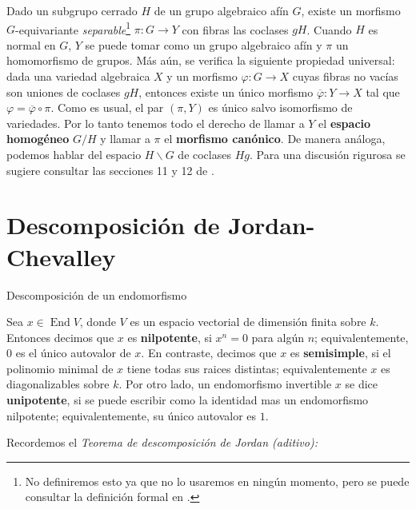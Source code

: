 \documentclass[spanish,10pt]{amsart}
\makeatletter
\renewcommand\subsection{\@startsection{subsection}{2}%
  \z@{.5\linespacing\@plus.7\linespacing}{-.5em}%
  {\normalfont\sffamily}}
\theoremstyle{definition}
\theoremstyle{remark}
\numberwithin{equation}{section}
\renewcommand{\bar}[1]{\overline{#1}}
\makeatother
\begin{document}
Dado un subgrupo cerrado $H$ de un grupo algebraico afín $G$, existe un morfismo $G$-equivariante \textit{separable}\footnote{No definiremos esto ya que no lo usaremos en ningún momento, pero se puede consultar la definición formal en \cite{humphreys2012linearAlgebraicGroups}.} $\pi : G \to Y$ con fibras las coclases $g H$. Cuando $H$ es normal en $G$, $Y$ se puede tomar como un grupo algebraico afín y $\pi$ un homomorfismo de grupos. Más aún, se verifica la siguiente propiedad universal: dada una variedad algebraica $X$ y un morfismo $\varphi : G \to X$ cuyas fibras no vacías son uniones de coclases $gH$, entonces existe un único morfismo $\bar \varphi : Y \to X$ tal que $\varphi = \bar \varphi \circ \pi$. Como es usual, el par $(\pi, Y)$ es único salvo isomorfismo de variedades. Por lo tanto tenemos todo el derecho de llamar a $Y$ el \textbf{espacio homogéneo} $G/H$ y llamar a $\pi$ el \textbf{morfismo canónico}. De manera análoga, podemos hablar del espacio $H\backslash G$ de coclases $Hg$. Para una discusión rigurosa se sugiere consultar las secciones 11 y 12 de \cite{humphreys2012linearAlgebraicGroups}.





\section{Descomposición de Jordan-Chevalley}

\subsection{Descomposición de un endomorfismo}

Sea $x \in \operatorname{End} V$, donde $V$ es un espacio vectorial de dimensión finita sobre $k$. Entonces decimos que $x$ es \textbf{nilpotente}, si $x^n = 0$ para algún $n$; equivalentemente, $0$ es el único autovalor de $x$. En contraste, decimos que $x$ es \textbf{semisimple}, si el polinomio minimal de $x$ tiene todas sus raices distintas; equivalentemente $x$ es diagonalizables sobre $k$. Por otro lado, un endomorfismo invertible $x$ se dice \textbf{unipotente}, si se puede escribir como la identidad mas un endomorfismo nilpotente; equivalentemente, su único autovalor es $1$.

Recordemos el \textit{Teorema de descomposición de Jordan (aditivo):}
\end{document}
